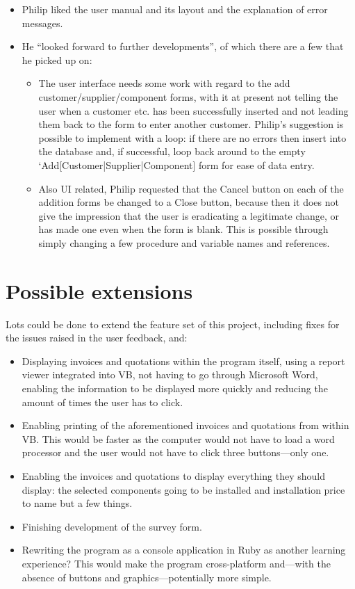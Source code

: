 \begin{itemize}
	\item{Philip liked the user manual and its layout and the explanation of error messages.}\\
	\item{He ``looked forward to further developments'', of which there are a few that he picked up on:}\\
	\begin{itemize}
		\item{The user interface needs some work with regard to the add customer\slash supplier\slash component forms, with it at present not telling the user when a customer etc. has been successfully inserted and not leading them back to the form to enter another customer.  Philip's suggestion is possible to implement with a loop: if there are no errors then insert into the database and, if successful, loop back around to the empty `Add[Customer|Supplier|Component] form for ease of data entry.}\\
		\item{Also UI related, Philip requested that the Cancel button on each of the addition forms be changed to a Close button, because then it does not give the impression that the user is eradicating a legitimate change, or has made one even when the form is blank.  This is possible through simply changing a few procedure and variable names and references.}\\
	\end{itemize}
\end{itemize}
	\section{Possible extensions}

Lots could be done to extend the feature set of this project, including fixes for the issues raised in the user feedback, and:

\begin{itemize}
	\item{Displaying invoices and quotations within the program itself, using a report viewer integrated into VB, not having to go through Microsoft Word, enabling the information to be displayed more quickly and reducing the amount of times the user has to click.}
	\item{Enabling printing of the aforementioned invoices and
quotations from within VB.  This would be faster as the computer would not have to load a word processor and the user would not have to click three buttons---only one.}
	\item{Enabling the invoices and quotations to display everything
they should display: the selected components going to be installed and installation price to name but a few things.}
	\item{Finishing development of the survey form.}
	\item{Rewriting the program as a console application in Ruby as another
learning experience?  This would make the program cross-platform and---with the absence of buttons and graphics---potentially more simple.}
\end{itemize}
